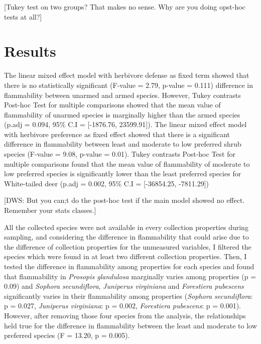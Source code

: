 \documentclass[12pt]{report}
\begin{document}
[Tukey test on two groups? That makes no sense. Why are you doing opst-hoc tests at all?]

\section{Results}

The linear mixed effect model with herbivore defense as fixed term showed that there is no statistically significant (F-value = 2.79, p-value = 0.111) difference in flammability between unarmed and armed species. However, Tukey contrasts Post-hoc Test for multiple comparisons showed that the mean value of flammability of unarmed species is marginally higher than the armed species (p.adj = 0.094, 95\% C.I = [-1876.76, 23599.91]). The linear mixed effect model with herbivore preference as fixed effect showed that there is a significant difference in flammability between least and moderate to low preferred shrub species (F-value = 9.08, p-value = 0.01). Tukey contrasts Post-hoc Test for multiple comparisons found that the mean value of flammability of moderate to low  preferred species is significantly lower than the least preferred species for White-tailed deer (p.adj = 0.002, 95\% C.I = [-36854.25, -7811.29])

[DWS: But you can;t do the post-hoc test if the main model showed no effect. Remember your stats classes.]



All the collected species were not available in every collection properties during sampling, and considering the difference in flammability that could arise due to the difference of collection properties for the unmeasured variables, I filtered the species which were found in at least two different collection properties. Then, I tested the difference in flammability among properties for each species and found that flammability in \emph{Prosopis glandulosa} marginally varies among properties (p = 0.09) and \emph{Sophora secundiflora}, \emph{Juniperus virginiana} and \emph{Forestiera pubescens} significantly varies in their flammability among properties (\emph{Sophora secundiflora}: p = 0.027, \emph{Juniperus virginiana}: p = 0.002, \emph{Forestiera pubescens}: p = 0.001). However, after removing those four species from the analysis, the relationships held true for the difference in flammability between the least and moderate to low preferred species (F = 13.20, p = 0.005).
\end{document}

